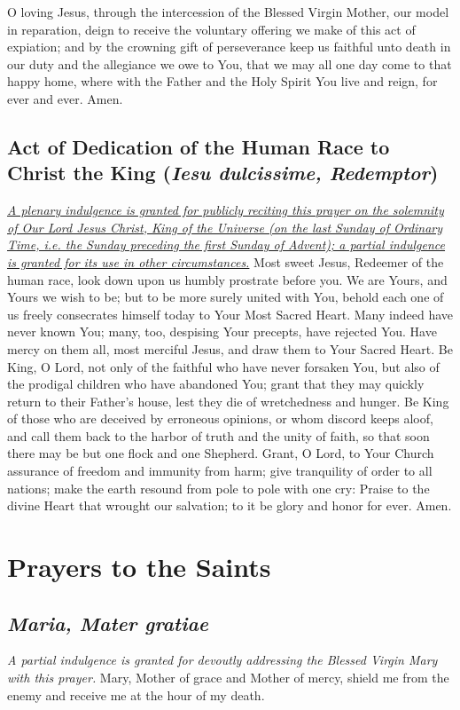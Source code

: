 \documentclass[12pt]{article}
\newcommand{\prayersection}[1]{\section{#1}}
\newcommand{\prayertitle}[1]{\subsection{#1}}
\newcommand{\indulgencedprayertitle}[1]{\prayertitle{#1 \protect\kreuz}}
\newcommand{\foreign}[1]{\textsl{#1}}
\newcommand{\note}[1]{{\small{\textsl{#1}}}\newline}
\newcommand{\linkednote}[2]{\hyperlink{#1}{\note{#2}}}
\begin{document}
O loving Jesus, through the intercession of the Blessed Virgin Mother, our model in reparation, deign to receive the voluntary offering we make of this act of expiation;
and by the crowning gift of perseverance keep us faithful unto death in our duty and the allegiance we owe to You, that we may all one day come to that happy home, where with the Father and the Holy Spirit You live and reign, for ever and ever. Amen.

\indulgencedprayertitle{Act of Dedication of the Human Race to Christ the King (\foreign{Iesu dulcissime, Redemptor})}
\linkednote{grant2}{A plenary indulgence is granted for publicly reciting this prayer on the solemnity of Our Lord Jesus Christ, King of the Universe (on the last Sunday of Ordinary Time, i.e. the Sunday preceding the first Sunday of Advent);
a partial indulgence is granted for its use in other circumstances.}
Most sweet Jesus, Redeemer of the human race, look down upon us humbly prostrate before you.
We are Yours, and Yours we wish to be;
but to be more surely united with You, behold each one of us freely consecrates himself today to Your Most Sacred Heart.
Many indeed have never known You;
many, too, despising Your precepts, have rejected You.
Have mercy on them all, most merciful Jesus, and draw them to Your Sacred Heart.
Be King, O Lord, not only of the faithful who have never forsaken You, but also of the prodigal children who have abandoned You;
grant that they may quickly return to their Father's house, lest they die of wretchedness and hunger.
Be King of those who are deceived by erroneous opinions, or whom discord keeps aloof, and call them back to the harbor of truth and the unity of faith, so that soon there may be but one flock and one Shepherd.
Grant, O Lord, to Your Church assurance of freedom and immunity from harm;
give tranquility of order to all nations;
make the earth resound from pole to pole with one cry:
Praise to the divine Heart that wrought our salvation;
to it be glory and honor for ever.
Amen.

\newpage

\prayersection{Prayers to the Saints}
\indulgencedprayertitle{\foreign{Maria, Mater gratiae}}
\note{A partial indulgence is granted for devoutly addressing the Blessed Virgin Mary with this prayer.}
Mary, Mother of grace and Mother of mercy, shield me from the enemy and receive me at the hour of my death.
\end{document}
